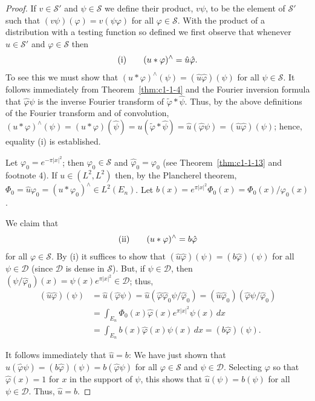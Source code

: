 \begin{proof}
If $v \in \mathscr{S}'$ and $\psi \in \mathscr{S}$ we define their product,
$v\psi$, to be the element of $\mathscr{S}'$ such that $(v\psi)(\varphi) = v(\psi\varphi)$
for all $\varphi \in \mathscr{S}$. With the product of a distribution with a
testing function so defined we first observe that whenever $u \in \mathscr{S}'$
and $\varphi \in \mathscr{S}$ then
\[
\textup{(i)}\qquad (u*\varphi)^{\wedge}=\hat{u}\hat{\varphi}.
\]
To see this we must show that
$(u * \varphi)^{\wedge}(\psi) = (\hat{u}\hat{\varphi})(\psi)$ for all
$\psi \in \mathscr{S}$. It follows immediately from
Theorem~\ref{thm:c1-1-4} and the Fourier inversion formula that
$\hat{\varphi}\psi$ is the inverse Fourier transform of
$\tilde{\varphi} * \hat{\psi}$. Thus, by the above definitions of the Fourier
transform and of convolution,
$(u * \varphi)^{\wedge}(\psi) = (u * \varphi)(\hat{\psi}) = u(\tilde{\varphi} * \hat{\psi}) = \hat{u}(\hat{\varphi}\psi) = (\hat{u}\hat{\varphi})(\psi)$;
hence, equality (i) is established.

Let $\varphi_{0} = e^{-\pi|x|^{2}}$; then $\varphi_{0} \in \mathscr{S}$ and
$\hat{\varphi}_{0} = \varphi_{0}$ (see Theorem~\ref{thm:c1-1-13} and footnote
4). If $u \in (L^{2}, L^{2})$ then, by the Plancherel theorem,
$\Phi_{0} = \hat{u}\varphi_{0} = (u * \varphi_{0})^{\wedge} \in L^{2}(E_{n})$.
Let $b(x) = e^{\pi|x|^{2}}\Phi_{0}(x) = \Phi_{0}(x)/\varphi_{0}(x)$.

We claim that
\[
\textup{(ii)}\qquad (u*\varphi)^{\wedge}=b\hat{\varphi}
\]
for all $\varphi \in \mathscr{S}$. By (i) it suffices to show that
$(\hat{u}\hat{\varphi})(\psi) = (b\hat{\varphi})(\psi)$ for all
$\psi \in \mathscr{D}$ (since $\mathscr{D}$ is dense in $\mathscr{S}$). But, if
$\psi \in \mathscr{D}$, then
$(\psi/\hat{\varphi}_{0})(x) = \psi(x)e^{\pi|x|^{2}} \in \mathscr{D}$; thus,
\begin{align*}
(\hat{u}\hat{\varphi})(\psi)
&=\hat{u}(\hat{\varphi}\psi)=\hat{u}(\hat{\varphi}\hat{\varphi}_{0}\psi/\hat{\varphi}_{0})
=(\hat{u}\hat{\varphi}_{0})(\hat{\varphi}\psi/\hat{\varphi}_{0})\\
&=\int_{E_{n}}\Phi_{0}(x)\hat{\varphi}(x)e^{\pi|x|^{2}}\psi(x)\,dx\\
&=\int_{E_{n}}b(x)\hat{\varphi}(x)\psi(x)\,dx=(b\hat{\varphi})(\psi).
\end{align*}

It follows immediately that $\hat{u} = b$: We have just shown that
$\hat{u}(\hat{\varphi}\psi) = (b\hat{\varphi})(\psi) = b(\hat{\varphi}\psi)$
for all $\varphi \in \mathscr{S}$ and $\psi \in \mathscr{D}$. Selecting
$\varphi$ so that $\hat{\varphi}(x) = 1$ for $x$ in the support of $\psi$,
this shows that $\hat{u}(\psi) = b(\psi)$ for all $\psi \in \mathscr{D}$.
Thus, $\hat{u} = b$.


\end{proof}
